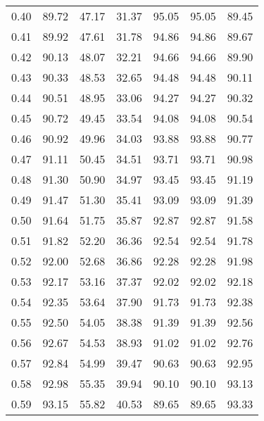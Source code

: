\begin{tabular}{|c|c|c|c|c|c|c|}
      0.40 &     89.72 &     47.17 &      31.37 &   95.05 &      95.05 &         89.45 \\
      0.41 &     89.92 &     47.61 &      31.78 &   94.86 &      94.86 &         89.67 \\
      0.42 &     90.13 &     48.07 &      32.21 &   94.66 &      94.66 &         89.90 \\
      0.43 &     90.33 &     48.53 &      32.65 &   94.48 &      94.48 &         90.11 \\
      0.44 &     90.51 &     48.95 &      33.06 &   94.27 &      94.27 &         90.32 \\
      0.45 &     90.72 &     49.45 &      33.54 &   94.08 &      94.08 &         90.54 \\
      0.46 &     90.92 &     49.96 &      34.03 &   93.88 &      93.88 &         90.77 \\
      0.47 &     91.11 &     50.45 &      34.51 &   93.71 &      93.71 &         90.98 \\
      0.48 &     91.30 &     50.90 &      34.97 &   93.45 &      93.45 &         91.19 \\
      0.49 &     91.47 &     51.30 &      35.41 &   93.09 &      93.09 &         91.39 \\
      0.50 &     91.64 &     51.75 &      35.87 &   92.87 &      92.87 &         91.58 \\
      0.51 &     91.82 &     52.20 &      36.36 &   92.54 &      92.54 &         91.78 \\
      0.52 &     92.00 &     52.68 &      36.86 &   92.28 &      92.28 &         91.98 \\
      0.53 &     92.17 &     53.16 &      37.37 &   92.02 &      92.02 &         92.18 \\
      0.54 &     92.35 &     53.64 &      37.90 &   91.73 &      91.73 &         92.38 \\
      0.55 &     92.50 &     54.05 &      38.38 &   91.39 &      91.39 &         92.56 \\
      0.56 &     92.67 &     54.53 &      38.93 &   91.02 &      91.02 &         92.76 \\
      0.57 &     92.84 &     54.99 &      39.47 &   90.63 &      90.63 &         92.95 \\
      0.58 &     92.98 &     55.35 &      39.94 &   90.10 &      90.10 &         93.13 \\
      0.59 &     93.15 &     55.82 &      40.53 &   89.65 &      89.65 &         93.33 \\

\end{tabular}
